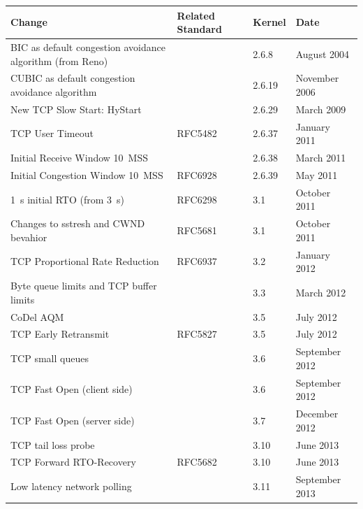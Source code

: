 \begin{table}[htb]
	\begin{tabu}{X[1.4]XX[0.4]X[0.7]}
	\toprule
	\textbf{Change} & \textbf{Related Standard} & \textbf{Kernel} & \textbf{Date} \\
	\midrule
	BIC as default congestion avoidance algorithm (from Reno) & & 2.6.8 & August 2004 \\
	CUBIC as default congestion avoidance algorithm & \cite{ha2008cubic} & 2.6.19 & November 2006 \\
	New TCP Slow Start: HyStart & \cite{Ha20112092} & 2.6.29 & March 2009 \\
	TCP User Timeout & RFC5482~\cite{rfc5482} & 2.6.37 & January 2011 \\
	Initial Receive Window \SI{10}{MSS} & \cite{rfc6928} & 2.6.38 & March 2011 \\
	Initial Congestion Window \SI{10}{MSS} & RFC6928~\cite{rfc6928} & 2.6.39 & May 2011 \\
	\SI{1}{\second} initial RTO (from \SI{3}{\second}) & RFC6298 & 3.1 & October 2011 \\
	Changes to sstresh and CWND bevahior & RFC5681~\cite{rfc5681} & 3.1 & October 2011 \\ %
	TCP Proportional Rate Reduction & RFC6937~\cite{rfc6937} & 3.2 & January 2012 \\
	Byte queue limits and TCP buffer limits &  & 3.3 & March 2012 \\ %
	CoDel AQM & \cite{nichols2014codel} & 3.5 & July 2012 \\
	TCP Early Retransmit & RFC5827~\cite{rfc5827} & 3.5 & July 2012 \\
	TCP small queues & & 3.6 & September 2012 \\ %
	TCP Fast Open (client side) & \cite{cheng2014tcptfo} & 3.6 & September 2012 \\
	TCP Fast Open (server side) & & 3.7 & December 2012 \\
	TCP tail loss probe & & 3.10 & June 2013 \\ %
	TCP Forward RTO-Recovery & RFC5682~\cite{rfc5682} & 3.10 & June 2013 \\
	Low latency network polling & & 3.11 & September 2013 \\ %

\end{tabu}
\end{table}
